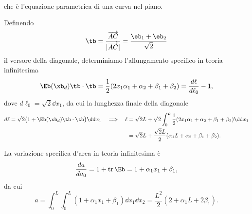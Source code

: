 \begin{exercise}
\begin{svolgimento}
\begin{enumerate}
\begin{equation}
\end{equation}
che è l'equazione parametrica di una curva nel piano.
	\end{enumerate}
	Definendo
	\begin{equation}
		\tb=\frac{\overrightarrow{AC}}{|\overrightarrow{AC}|}=\frac{\eb_{1}+\eb_{2}}{\sqrt{2}}
	\end{equation}
	il versore della diagonale, determiniamo l'allungamento specifico in teoria infinitesima
	\begin{equation}
		\Eb(\xb_{d})\tb\cdot\tb=\frac{1}{2}(2x_{1}\alpha_{1}+\alpha_{2}+\beta_{1}+\beta_{2})=\frac{d\ell}{d\ell_0}-1,
	\end{equation}
dove $d\ell_0=\sqrt2 \dd x_1$, 
da cui la lunghezza finale della diagonale
\begin{equation}
\begin{aligned}
	d\ell=	\sqrt{2}\big(1+\Eb(\xb_{d})\tb\cdot\tb\big)\dd x_1\quad \Longrightarrow   \quad \ell&=\sqrt{2}L+\sqrt{2}\int_0^L\frac{1}{2}(2x_{1}\alpha_{1}+\alpha_{2}+\beta_{1}+\beta_{2})\dd x_1\\
	&=\sqrt{2}L+\frac{\sqrt{2}L}{2}(\alpha_1 L+\alpha_2+\beta_1+\beta_2).
\end{aligned}
\end{equation}
\item La variazione specifica d'area in teoria infinitesima è
\begin{equation}
	\frac{d a}{da_0}=1+\operatorname{tr}\Eb=1+\alpha_1 x_1+\beta_1,
\end{equation}
da cui
\begin{equation}
a=\int_0^L\int_0^L(1+\alpha_1 x_1+\beta_1)\dd x_1\dd x_2=\frac{L^2}{2}(2+\alpha_1 L+2\beta_1).
\end{equation}
\end{svolgimento}

\end{exercise}

